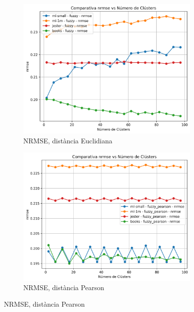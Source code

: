 \documentclass[a4paper,12pt]{report}
\begin{document}
\begin{figure}[H]
    \vspace{1em}

    \begin{subfigure}[b]{0.49\textwidth}
        \includegraphics[width=\textwidth]{Figuras/nrmse-fuzzy-all.png}
        \caption{NRMSE, distància Euclidiana}
        \label{fig:fuzzy-clustering-results-c}
    \end{subfigure}
    \hfill
    \begin{subfigure}[b]{0.49\textwidth}
        \includegraphics[width=\textwidth]{Figuras/nrmse-fuzzy_pearson-all.png}
        \caption{NRMSE, distància Pearson}
        \label{fig:fuzzy-clustering-results-d}
    \end{subfigure}


\end{figure}
\end{document}
